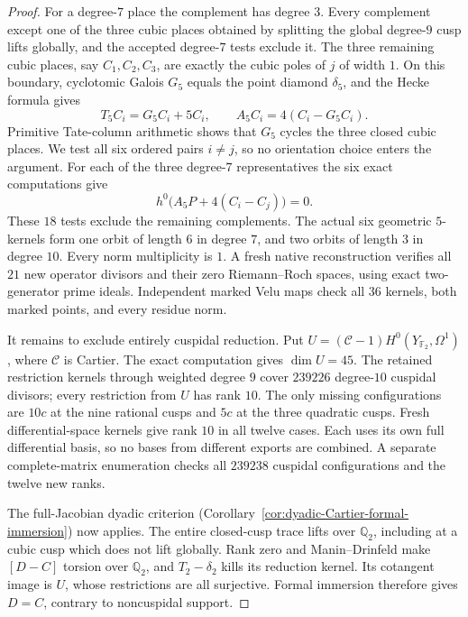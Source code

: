 \begin{proof}
For a degree-$7$ place the complement has degree $3$.
Every complement except one of the three cubic places obtained
by splitting the global degree-$9$ cusp lifts globally, and the
accepted degree-$7$ tests exclude it.
The three remaining cubic places, say $C_1,C_2,C_3$, are exactly
the cubic poles of $j$ of width $1$.
On this boundary, cyclotomic Galois $G_5$ equals the point diamond
$\delta_5$, and the Hecke formula gives
\[
 T_5C_i=G_5C_i+5C_i,\qquad
                   A_5C_i=4(C_i-G_5C_i).
\]
Primitive Tate-column arithmetic shows that $G_5$ cycles the three
closed cubic places. We test all six ordered pairs $i\ne j$,
so no orientation choice enters the argument.
For each of the three degree-$7$ representatives the six exact
computations give
\[
                      h^0\bigl(A_5P+4(C_i-C_j)\bigr)=0.
\]
These $18$ tests exclude the remaining complements.
The actual six geometric $5$-kernels form one orbit of length $6$
in degree $7$, and two orbits of length $3$ in degree $10$.
Every norm multiplicity is $1$.
A fresh native reconstruction verifies all $21$ new operator
divisors and their zero Riemann--Roch spaces, using exact
two-generator prime ideals. Independent marked Velu maps check
all $36$ kernels, both marked points, and every residue norm.

It remains to exclude entirely cuspidal reduction.
Put $U=(\mathcal C-1)H^0(Y_{\mathbb F_2},\Omega^1)$,
where $\mathcal C$ is Cartier. The exact computation gives
$\dim U=45$. The retained restriction kernels through weighted
degree $9$ cover $239226$ degree-$10$ cuspidal divisors;
every restriction from $U$ has rank $10$.
The only missing configurations are $10c$ at the nine rational
cusps and $5c$ at the three quadratic cusps.
Fresh differential-space kernels give rank $10$ in all twelve
cases. Each uses its own full differential basis, so no bases
from different exports are combined.
A separate complete-matrix enumeration checks all $239238$
cuspidal configurations and the twelve new ranks.

The full-Jacobian dyadic criterion
(Corollary~\ref{cor:dyadic-Cartier-formal-immersion}) now applies.
The entire closed-cusp trace lifts over $\mathbb Q_2$, including
at a cubic cusp which does not lift globally.
Rank zero and Manin--Drinfeld make $[D-C]$ torsion over
$\mathbb Q_2$, and $T_2-\delta_2$ kills its reduction kernel.
Its cotangent image is $U$, whose restrictions are all surjective.
Formal immersion therefore gives $D=C$, contrary to noncuspidal
support.
\end{proof}
